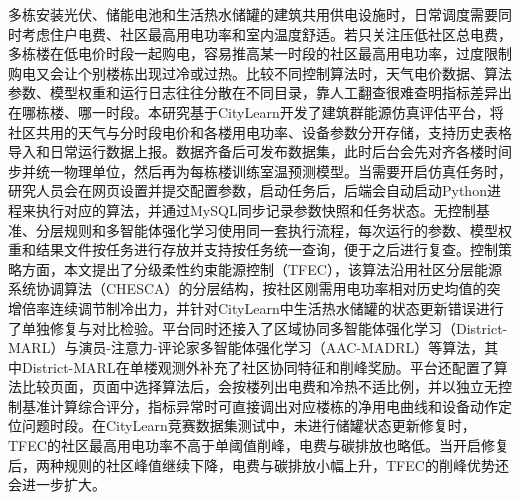 \begin{ChineseAbstract}
    多栋安装光伏、储能电池和生活热水储罐的建筑共用供电设施时，日常调度需要同时考虑住户电费、社区最高用电功率和室内温度舒适。若只关注压低社区总电费，多栋楼在低电价时段一起购电，容易推高某一时段的社区最高用电功率，过度限制购电又会让个别楼栋出现过冷或过热。比较不同控制算法时，天气电价数据、算法参数、模型权重和运行日志往往分散在不同目录，靠人工翻查很难查明指标差异出在哪栋楼、哪一时段。本研究基于CityLearn开发了建筑群能源仿真评估平台，将社区共用的天气与分时段电价和各楼用电功率、设备参数分开存储，支持历史表格导入和日常运行数据上报。数据齐备后可发布数据集，此时后台会先对齐各楼时间步并统一物理单位，然后再为每栋楼训练室温预测模型。当需要开启仿真任务时，研究人员会在网页设置并提交配置参数，启动任务后，后端会自动启动Python进程来执行对应的算法，并通过MySQL同步记录参数快照和任务状态。无控制基准、分层规则和多智能体强化学习使用同一套执行流程，每次运行的参数、模型权重和结果文件按任务进行存放并支持按任务统一查询，便于之后进行复查。控制策略方面，本文提出了分级柔性约束能源控制（TFEC），该算法沿用社区分层能源系统协调算法（CHESCA）的分层结构，按社区刚需用电功率相对历史均值的突增倍率连续调节制冷出力，并针对CityLearn中生活热水储罐的状态更新错误进行了单独修复与对比检验。平台同时还接入了区域协同多智能体强化学习（District-MARL）与演员-注意力-评论家多智能体强化学习（AAC-MADRL）等算法，其中District-MARL在单楼观测外补充了社区协同特征和削峰奖励。平台还配置了算法比较页面，页面中选择算法后，会按楼列出电费和冷热不适比例，并以独立无控制基准计算综合评分，指标异常时可直接调出对应楼栋的净用电曲线和设备动作定位问题时段。在CityLearn竞赛数据集测试中，未进行储罐状态更新修复时，TFEC的社区最高用电功率不高于单阈值削峰，电费与碳排放也略低。当开启修复后，两种规则的社区峰值继续下降，电费与碳排放小幅上升，TFEC的削峰优势还会进一步扩大。

\end{ChineseAbstract}

